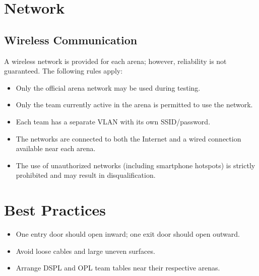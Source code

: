 \section{Network}

\subsection{Wireless Communication}
A wireless network is provided for each arena; however, reliability is not guaranteed. The following rules apply:
\begin{itemize}
    \item Only the official arena network may be used during testing.
    \item Only the team currently active in the arena is permitted to use the network.
    \item Each team has a separate VLAN with its own SSID/password.
    \item The networks are connected to both the Internet and a wired connection available near each arena.
    \item The use of unauthorized networks (including smartphone hotspots) is strictly prohibited and may result in disqualification.
\end{itemize}

\section{Best Practices}
\begin{itemize}
    \item One entry door should open inward; one exit door should open outward.
    \item Avoid loose cables and large uneven surfaces.
    \item Arrange DSPL and OPL team tables near their respective arenas.
\end{itemize}

